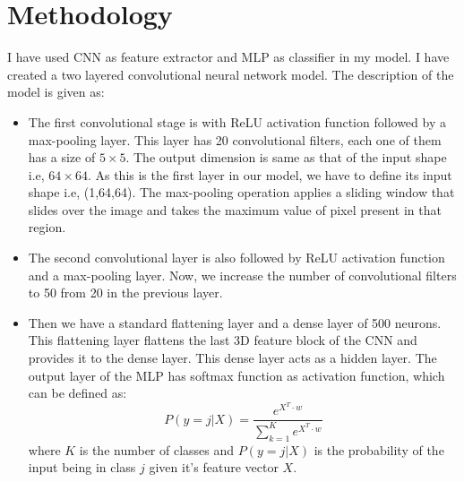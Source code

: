 \section{Methodology}
I have used CNN as feature extractor and MLP as classifier in my model. I have created a two layered convolutional neural network model. The description of the model is given as: 
\begin{itemize}
    \item The first convolutional stage is with ReLU activation function followed by a max-pooling layer. This layer has 20 convolutional filters, each one of them has a size of $5\times 5$. The output dimension is same as that of the input shape i.e, $64\times 64$. As this is the first layer in our model, we have to define its input shape i.e, (1,64,64). The max-pooling operation applies a sliding window that slides over the image and takes the maximum value of pixel present in that region.
    
    \item The second convolutional layer is also followed by ReLU activation function and a max-pooling layer. Now, we increase the number of convolutional filters to 50 from 20 in the previous layer.
    
    \item Then we have a standard flattening layer and a dense layer of 500 neurons. This flattening layer flattens the last 3D feature block of the CNN and provides it to the dense layer. This dense layer acts as a hidden layer. The output layer of the MLP has softmax function as activation function, which can be defined as: $$P(y=j|X)=\frac{e^{X^T\cdot w}}{\sum_{k=1}^{K}e^{X^T\cdot w}}$$ where $K$ is the number of classes and $P(y=j|X)$ is the probability of the input being in class $j$ given it's feature vector $X$.
\end{itemize}

